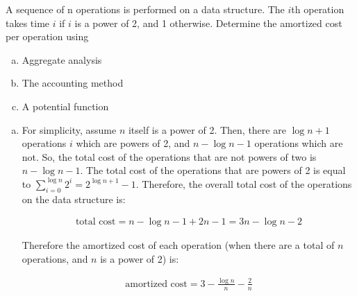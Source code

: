 \documentclass[fleqn]{homework}
\begin{document}
  \begin{problem}{5}
    \begin{question}
      A sequence of n operations is performed on a data structure.  The $i$th
      operation takes time $i$ if $i$ is a power of 2, and 1
      otherwise. Determine the amortized cost per operation using
      \begin{enumerate}[a.]
      \item Aggregate analysis
      \item The accounting method
      \item A potential function
      \end{enumerate}
    \end{question}

    \begin{enumerate}[a.]
    \item For simplicity, assume $n$ itself is a power of 2.  Then, there are
      $\log n + 1$ operations $i$ which are powers of 2, and $n - \log n - 1$
      operations which are not.  So, the total cost of the operations that are
      not powers of two is $n - \log n - 1$.  The total cost of the operations
      that are powers of 2 is equal to
      $\sum_{i=0}^{\log n} 2^i = 2^{\log n + 1} - 1$.  Therefore, the overall
      total cost of the operations on the data structure is:

      \begin{align*}
        \text{total cost} = n - \log n - 1 + 2n - 1 = 3n - \log n - 2
      \end{align*}

      Therefore the amortized cost of each operation (when there are a total of
      $n$ operations, and $n$ is a power of 2) is:

      \begin{align*}
        \text{amortized cost} = 3 - \frac{\log n}{n} - \frac{2}{n}
      \end{align*}


\end{enumerate}
\end{problem}
\end{document}
